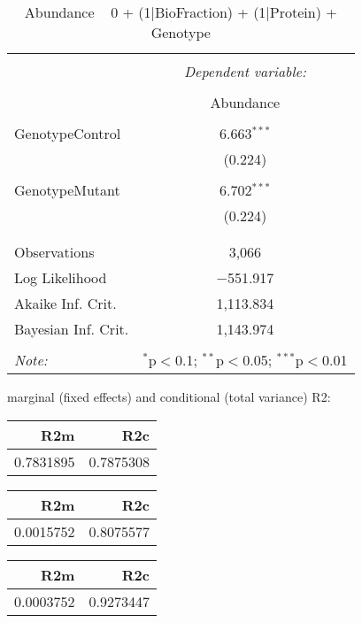 \documentclass[11pt]{report}
\begin{document}
\begin{table}[!htbp] \centering 
  \caption{Abundance ~ 0 + (1|BioFraction) + (1|Protein) + Genotype} 
  \label{} 
\begin{tabular}{@{\extracolsep{5pt}}lc} 
\\[-1.8ex]\hline 
\hline \\[-1.8ex] 
 & \multicolumn{1}{c}{\textit{Dependent variable:}} \\ 
\cline{2-2} 
\\[-1.8ex] & Abundance \\ 
\hline \\[-1.8ex] 
 GenotypeControl & 6.663$^{***}$ \\ 
  & (0.224) \\ 
  & \\ 
 GenotypeMutant & 6.702$^{***}$ \\ 
  & (0.224) \\ 
  & \\ 
\hline \\[-1.8ex] 
Observations & 3,066 \\ 
Log Likelihood & $-$551.917 \\ 
Akaike Inf. Crit. & 1,113.834 \\ 
Bayesian Inf. Crit. & 1,143.974 \\ 
\hline 
\hline \\[-1.8ex] 
\textit{Note:}  & \multicolumn{1}{r}{$^{*}$p$<$0.1; $^{**}$p$<$0.05; $^{***}$p$<$0.01} \\ 
\end{tabular} 
\end{table} 
marginal (fixed effects) and conditional (total variance) R2:

\begin{tabular}{r|r}
\hline
R2m & R2c\\
\hline
0.7831895 & 0.7875308\\
\hline
\end{tabular}

\begin{tabular}{r|r}
\hline
R2m & R2c\\
\hline
0.0015752 & 0.8075577\\
\hline
\end{tabular}

\begin{tabular}{r|r}
\hline
R2m & R2c\\
\hline
0.0003752 & 0.9273447\\
\hline
\end{tabular}
\end{document}
